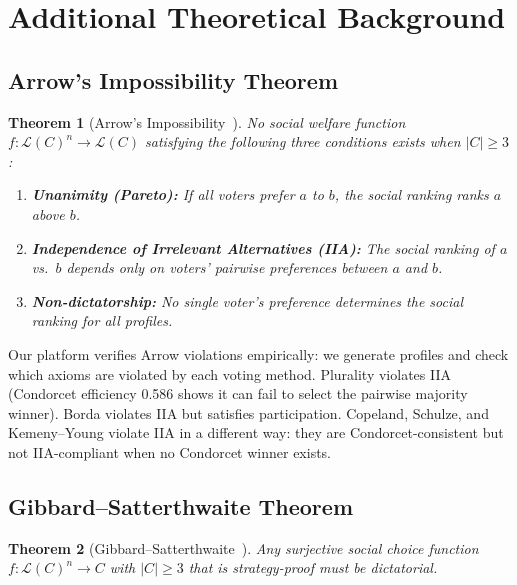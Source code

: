 \documentclass[10pt]{article}
\newtheorem{theorem}{Theorem}
\begin{document}
\section{Additional Theoretical Background}
\label{app:theory}

\subsection{Arrow's Impossibility Theorem}

\begin{theorem}[Arrow's Impossibility~\citep{arrow1951social}]
No social welfare function $f: \mathcal{L}(C)^n \to \mathcal{L}(C)$ satisfying the following three conditions exists when $|C| \geq 3$:
\begin{enumerate}
  \item \textbf{Unanimity (Pareto):} If all voters prefer $a$ to $b$, the social ranking ranks $a$ above $b$.
  \item \textbf{Independence of Irrelevant Alternatives (IIA):} The social ranking of $a$ vs.\ $b$ depends only on voters' pairwise preferences between $a$ and $b$.
  \item \textbf{Non-dictatorship:} No single voter's preference determines the social ranking for all profiles.
\end{enumerate}
\end{theorem}

Our platform verifies Arrow violations empirically: we generate profiles and check which axioms are violated by each voting method. Plurality violates IIA (Condorcet efficiency 0.586 shows it can fail to select the pairwise majority winner). Borda violates IIA but satisfies participation. Copeland, Schulze, and Kemeny--Young violate IIA in a different way: they are Condorcet-consistent but not IIA-compliant when no Condorcet winner exists.

\subsection{Gibbard--Satterthwaite Theorem}

\begin{theorem}[Gibbard--Satterthwaite~\citep{gibbard1973manipulation, satterthwaite1975strategy}]
Any surjective social choice function $f: \mathcal{L}(C)^n \to C$ with $|C| \geq 3$ that is strategy-proof must be dictatorial.
\end{theorem}
\end{document}
